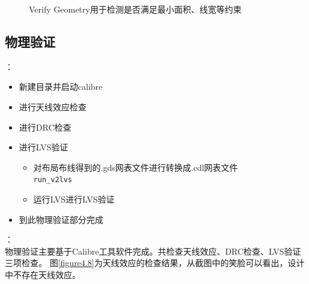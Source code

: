 \documentclass[a4paper,12pt]{report}
\begin{document}
\begin{figure}[!hbtp]
\centering
{}
\:
\caption{Verify Geometry用于检测是否满足最小面积、线宽等约束}
\label{figure4.7}
\end{figure}

\subsection{物理验证}
：
\begin{itemize}
\item 新建目录并启动calibre
\item 进行天线效应检查
\item 进行DRC检查
\item 进行LVS验证
\begin{itemize}
\item 对布局布线得到的.gds网表文件进行转换成.cdl网表文件\\
\verb|run_v2lvs|
\item 运行LVS进行LVS验证
\end{itemize}
\item 到此物理验证部分完成
\end{itemize}
：\\
\indent 物理验证主要基于Calibre工具软件完成。共检查天线效应、DRC检查、LVS验证三项检查。
图\ref{figure4.8}为天线效应的检查结果，从截图中的笑脸可以看出，设计中不存在天线效应。
\end{document}
